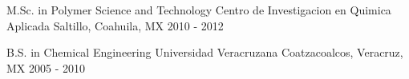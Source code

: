 


\begin{cventries}


\cventry
{M.Sc. in Polymer Science and Technology} %
{Centro de Investigacion en Quimica Aplicada} %
{Saltillo, Coahuila, MX} %
{2010 - 2012} %
{ %
	\begin{cvitems}
	\end{cvitems}
}


\cventry
{B.S. in Chemical Engineering} %
{Universidad Veracruzana} %
{Coatzacoalcos, Veracruz, MX} %
{2005 - 2010} %
{ %
	\begin{cvitems}
	\end{cvitems}
}


\end{cventries}